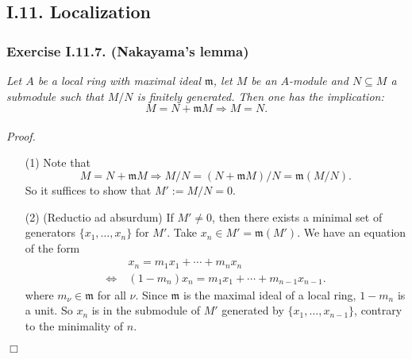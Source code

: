 \documentclass{article}
\begin{document}



\subsection*{I.11. Localization \\}



\subsubsection*{Exercise I.11.7. (Nakayama's lemma)}
\emph{Let $A$ be a local ring with maximal ideal $\mathfrak{m}$,
let $M$ be an $A$-module and
$N \subseteq M$ a submodule such that $M/N$ is finitely generated.
Then one has the implication:}
\[
  M = N + \mathfrak{m}M \Longrightarrow M = N.
\] \\



\emph{Proof.}
\begin{enumerate}
\item[(1)]
  Note that
  \[
    M = N + \mathfrak{m}M
    \Longrightarrow
    M/N = (N + \mathfrak{m}M)/N = \mathfrak{m}(M/N).
  \]
  So it suffices to show that $M' := M/N = 0$.

\item[(2)]
  (Reductio ad absurdum)
  If $M' \neq 0$,
  then there exists a minimal set of generators $\{ x_1, \ldots, x_n \}$ for $M'$.
  Take $x_n \in M' = \mathfrak{m}(M')$.
  We have an equation of the form
  \begin{align*}
    &\: x_n = m_1 x_1 + \cdots + m_n x_n \\
    \Longleftrightarrow &\:
    (1-m_n) x_n = m_1 x_1 + \cdots + m_{n-1} x_{n-1}.
  \end{align*}
  where $m_\nu \in \mathfrak{m}$ for all $\nu$.
  Since $\mathfrak{m}$ is the maximal ideal of a local ring, $1-m_n$ is a unit.
  So $x_n$ is in the submodule of $M'$ generated by $\{ x_1, \ldots, x_{n-1} \}$,
  contrary to the minimality of $n$.
\end{enumerate}
$\Box$ \\\\
\end{document}
